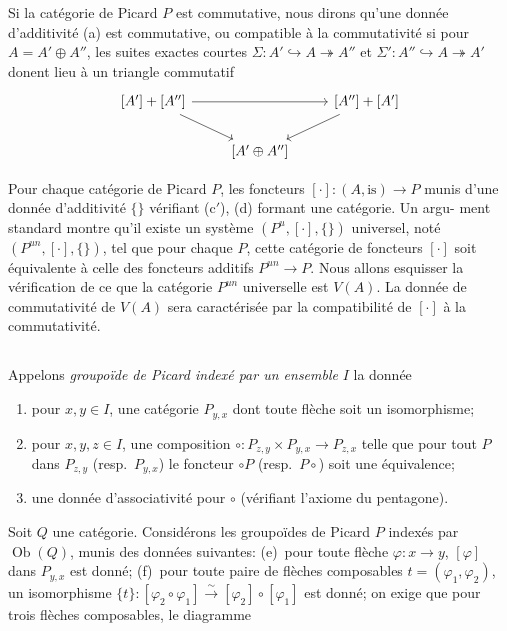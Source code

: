 \documentclass[12pt,a4paper]{article}
\theoremstyle{plain}
\theoremstyle{definition}
\DeclareMathOperator{\Ob}{Ob}
\begin{document}
Si la cat\'egorie de Picard $P$ est commutative, nous dirons qu'une donn\'ee
d'additivit\'e (a) est commutative, ou compatible \`a la commutativit\'e si pour $A =
A' \oplus A''$, les suites exactes courtes $\Sigma: A' \hookrightarrow A \twoheadrightarrow A''$ et $\Sigma': A'' \hookrightarrow A \twoheadrightarrow A'$
donent lieu \`a un triangle commutatif
\begin{equation}\label{eq:4.3.1}
\begin{tikzcd}
{[A']} + [A''] \arrow[dr] \arrow[rr] & & {[A''] + [A']} \arrow[dl] \\
& {[A' \oplus A'']} &
\end{tikzcd}
\end{equation}

Pour chaque cat\'egorie de Picard $P$, les foncteurs $[\cdot]: (A, \text{is}) \to P$ munis
d'une donn\'ee d'additivit\'e $\{\}$ v\'erifiant (c$'$), (d) formant une cat\'egorie. Un argu-
ment standard montre qu'il existe un syst\`eme $(P^u, [\cdot], \{\})$ universel, not\'e
$(P^{un}, [\cdot], \{\})$, tel que pour chaque $P$, cette cat\'egorie de foncteurs $[\cdot]$
soit \'equivalente \`a celle des foncteurs additifs $P^{un} \to P$. Nous allons esquisser
la v\'erification de ce que la cat\'egorie $P^{un}$ universelle est $V(A)$. La donn\'ee
de commutativit\'e de $V(A)$ sera caract\'eris\'ee par la compatibilit\'e de $[\cdot]$ \`a la
commutativit\'e.

\subsection{}

Appelons \emph{groupo\"ide de Picard index\'e par un ensemble} $I$ la donn\'ee

\begin{enumerate}[label=(\alph*)]
\item pour $x, y \in I$, une cat\'egorie $P_{y,x}$ dont toute fl\`eche soit un isomorphisme;
\item pour $x, y, z \in I$, une composition $\circ: P_{z,y} \times P_{y,x} \to P_{z,x}$ telle que pour tout $P$
dans $P_{z,y}$ (resp.\ $P_{y,x}$) le foncteur $\circ P$ (resp.\ $P \circ$) soit une \'equivalence;
\item une donn\'ee d'associativit\'e pour $\circ$ (v\'erifiant l'axiome du pentagone).
\end{enumerate}

Soit $Q$ une cat\'egorie. Consid\'erons les groupo\"ides de Picard $P$ index\'es
par $\Ob(Q)$, munis des donn\'ees suivantes: (e)~pour toute fl\`eche $\varphi: x \to y$,
$[\varphi]$ dans $P_{y,x}$ est donn\'e; (f)~pour toute paire de fl\`eches composables $t =
(\varphi_1, \varphi_2)$, un isomorphisme $\{t\}: [\varphi_2 \circ \varphi_1] \xrightarrow{\sim} [\varphi_2] \circ [\varphi_1]$ est donn\'e; on exige
que pour trois fl\`eches composables, le diagramme
\end{document}
